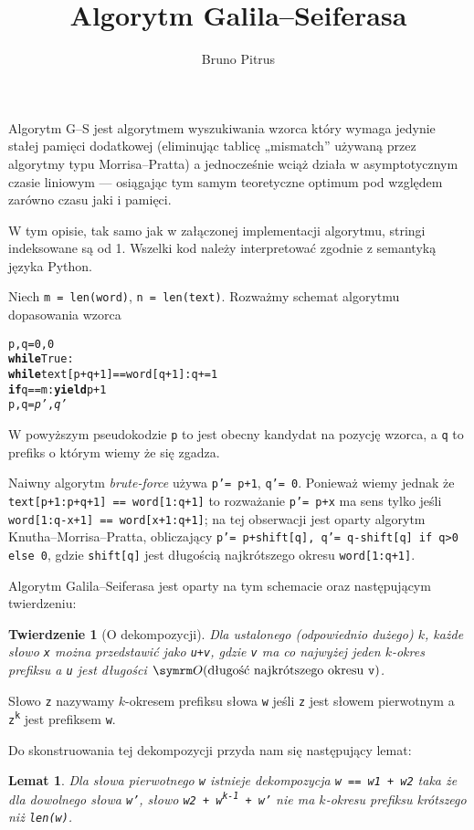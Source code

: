 \documentclass[a4paper]{article}
\newtheorem*{theorem}{Twierdzenie}
\newtheorem*{lemma}{Lemat}
\begin{document}
\title{Algorytm Galila–Seiferasa}
\author{Bruno Pitrus}
\date{}
\maketitle
Algorytm G–S jest algorytmem wyszukiwania wzorca który wymaga jedynie stałej pamięci dodatkowej (eliminując tablicę „mismatch” używaną przez algorytmy typu Morrisa–Pratta) a jednocześnie wciąż działa w asymptotycznym czasie liniowym — osiągając tym samym teoretyczne optimum pod względem zarówno czasu jaki i pamięci.

W tym opisie, tak samo jak w załączonej implementacji algorytmu, stringi indeksowane są od 1. Wszelki kod należy interpretować zgodnie z semantyką języka Python.

Niech \texttt{m = len(word)}, \texttt{n = len(text)}. Rozważmy schemat algorytmu dopasowania wzorca
\begin{alltt}
p,q= 0,0
\textbf{while} True:
  \textbf{while} text[p+q+1] == word[q+1]: q+= 1
  \textbf{if} q == m: \textbf{yield} p+1
  p,q= \textit{p'},\textit{q'}
\end{alltt}
W powyższym pseudokodzie \texttt{p} to jest obecny kandydat na pozycję wzorca, a \texttt{q} to prefiks o którym wiemy że się zgadza.

Naiwny algorytm \textit{brute-force} używa \texttt{p'= p+1}, \texttt{q'= 0}. Ponieważ wiemy jednak że \texttt{text[p+1:p+q+1] == word[1:q+1]} to rozważanie \texttt{p'= p+x} ma sens tylko jeśli \texttt{word[1:q-x+1] == word[x+1:q+1]}; na tej obserwacji jest oparty algorytm Knutha–Morrisa–Pratta, obliczający \texttt{p'= p+shift[q], q'= q-shift[q] if q>0 else 0}, gdzie \texttt{shift[q]} jest długością najkrótszego okresu \texttt{word[1:q+1]}.

Algorytm Galila–Seiferasa jest oparty na tym schemacie oraz następującym twierdzeniu:
\begin{theorem}[O dekompozycji]
Dla ustalonego (odpowiednio dużego) \(k\), każde słowo \texttt{x} można przedstawić jako \texttt{u+v}, gdzie \texttt{v} ma co najwyżej jeden \textit{\(k\)-okres prefiksu} a \texttt{u} jest długości \(\symrm O{\left(\text{długość najkrótszego okresu \texttt{v}}\right)}\). 
\end{theorem}
Słowo \texttt{z} nazywamy \(k\)-okresem prefiksu słowa \texttt{w} jeśli \texttt{z} jest słowem pierwotnym a \texttt{z\textsuperscript{k}} jest prefiksem \texttt{w}.

Do skonstruowania tej dekompozycji przyda nam się następujący lemat:
\begin{lemma}
Dla słowa \textit{pierwotnego} \texttt{w} istnieje dekompozycja \texttt{w == w1 + w2} taka że dla dowolnego słowa \texttt{w'}, słowo \texttt{w2 + w\textsuperscript{k-1} + w'} nie ma \(k\)-okresu prefiksu krótszego niż \texttt{len(w)}.
\end{lemma}
\end{document}
